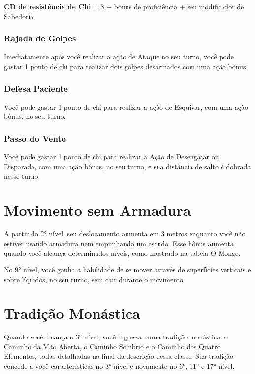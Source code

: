 \begin{multicols}{2}
\begin{center}
\textbf{CD de resistência de Chi} = 8 + bônus de proficiência +
seu modificador de Sabedoria
\end{center}

\subsubsection*{Rajada de Golpes}%
\label{ssub:rajada_de_golpes}

Imediatamente após você realizar a ação de Ataque no seu turno, você pode gastar
1 ponto de chi para realizar dois golpes desarmados com uma ação bônus.

\subsubsection{Defesa Paciente}%
\label{ssub:defesa_paciente}

Você pode gastar 1 ponto de chi para realizar a ação de Esquivar, com uma ação
bônus, no seu turno.

\subsubsection*{Passo do Vento}%
\label{ssub:passo_do_vento}

Você pode gastar 1 ponto de chi para realizar a Ação de Desengajar ou Disparada,
com uma ação bônus, no seu turno, e sua distância de salto é dobrada nesse
turno.

\section*{Movimento sem Armadura}%
\label{sec:movimento_sem_armadura}

A partir do 2° nível, seu deslocamento aumenta em 3 metros enquanto você não
estiver usando armadura nem empunhando um escudo. Esse bônus aumenta quando você
alcança determinados níveis, como mostrado na tabela O Monge.

No 9° nível, você ganha a habilidade de se mover através de superfícies
verticais e sobre líquidos, no seu turno, sem cair durante o movimento.

\section*{Tradição Monástica}%
\label{sec:tradicao_monastica}

Quando você alcança o 3° nível, você ingressa numa tradição monástica: o Caminho
da Mão Aberta, o Caminho Sombrio e o Caminho dos Quatro Elementos, todas
detalhadas no final da descrição dessa classe. Sua tradição concede a você
características no 3° nível e novamente no 6°, 11° e 17° nível.


\end{multicols}
